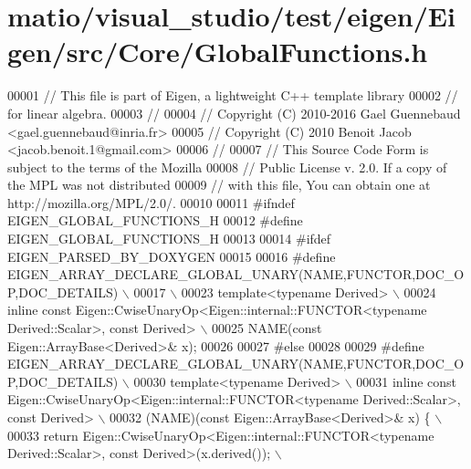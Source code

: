 \hypertarget{matio_2visual__studio_2test_2eigen_2_eigen_2src_2_core_2_global_functions_8h_source}{}\section{matio/visual\+\_\+studio/test/eigen/\+Eigen/src/\+Core/\+Global\+Functions.h}
\label{matio_2visual__studio_2test_2eigen_2_eigen_2src_2_core_2_global_functions_8h_source}

\begin{DoxyCode}
00001 \textcolor{comment}{// This file is part of Eigen, a lightweight C++ template library}
00002 \textcolor{comment}{// for linear algebra.}
00003 \textcolor{comment}{//}
00004 \textcolor{comment}{// Copyright (C) 2010-2016 Gael Guennebaud <gael.guennebaud@inria.fr>}
00005 \textcolor{comment}{// Copyright (C) 2010 Benoit Jacob <jacob.benoit.1@gmail.com>}
00006 \textcolor{comment}{//}
00007 \textcolor{comment}{// This Source Code Form is subject to the terms of the Mozilla}
00008 \textcolor{comment}{// Public License v. 2.0. If a copy of the MPL was not distributed}
00009 \textcolor{comment}{// with this file, You can obtain one at http://mozilla.org/MPL/2.0/.}
00010 
00011 \textcolor{preprocessor}{#ifndef EIGEN\_GLOBAL\_FUNCTIONS\_H}
00012 \textcolor{preprocessor}{#define EIGEN\_GLOBAL\_FUNCTIONS\_H}
00013 
00014 \textcolor{preprocessor}{#ifdef EIGEN\_PARSED\_BY\_DOXYGEN}
00015 
00016 \textcolor{preprocessor}{#define EIGEN\_ARRAY\_DECLARE\_GLOBAL\_UNARY(NAME,FUNCTOR,DOC\_OP,DOC\_DETAILS) \(\backslash\)}
00017 \textcolor{preprocessor}{ \(\backslash\)}
00023 \textcolor{preprocessor}{  template<typename Derived> \(\backslash\)}
00024 \textcolor{preprocessor}{  inline const Eigen::CwiseUnaryOp<Eigen::internal::FUNCTOR<typename Derived::Scalar>, const Derived> \(\backslash\)}
00025 \textcolor{preprocessor}{  NAME(const Eigen::ArrayBase<Derived>& x);}
00026 
00027 \textcolor{preprocessor}{#else}
00028 
00029 \textcolor{preprocessor}{#define EIGEN\_ARRAY\_DECLARE\_GLOBAL\_UNARY(NAME,FUNCTOR,DOC\_OP,DOC\_DETAILS) \(\backslash\)}
00030 \textcolor{preprocessor}{  template<typename Derived> \(\backslash\)}
00031 \textcolor{preprocessor}{  inline const Eigen::CwiseUnaryOp<Eigen::internal::FUNCTOR<typename Derived::Scalar>, const Derived> \(\backslash\)}
00032 \textcolor{preprocessor}{  (NAME)(const Eigen::ArrayBase<Derived>& x) \{ \(\backslash\)}
00033 \textcolor{preprocessor}{    return Eigen::CwiseUnaryOp<Eigen::internal::FUNCTOR<typename Derived::Scalar>, const
       Derived>(x.derived()); \(\backslash\)}

\end{DoxyCode}
